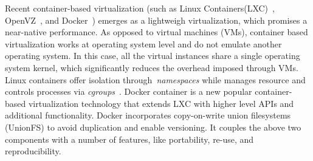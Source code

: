 Recent container-based virtualization (such as Linux Containers(LXC)~\cite{xxx}, OpenVZ~\cite{bibid}, and Docker~\cite{}) emerges as a lightweigh virtualization, which promises a near-native performance.
%
As opposed to virtual machines (VMs), container based virtualization works at operating system level and do not emulate another operating system.
%
In this case, all the virtual instances share a single operating system kernel, which significantly reduces the overhead imposed through VMs.
%
Linux containers offer isolation through~\textit{namespaces} while manages resource and controls processes via \textit{cgroups}~\cite{}.
%
Docker container is a new popular container-based virtualization technology that extends LXC with higher level APIs and additional functionality.
%
%
Docker incorporates copy-on-write union filesystems (UnionFS) to avoid duplication and enable versioning.
%
It couples the above two components with a number of features, like portability, re-use, and reproducibility.






